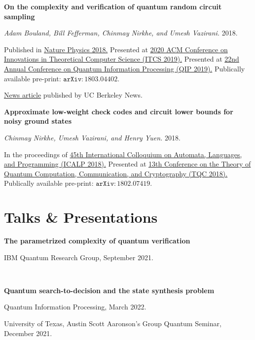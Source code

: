 \documentclass{article}
\begin{document}
\begin{enumerate}[{leftmargin=*,start=8,label=[\arabic*]\addtocounter{enumi}{-2}}]
\item \textbf{On the complexity and verification of quantum random circuit sampling}

\emph{Adam Bouland, Bill Fefferman, Chinmay Nirkhe, and Umesh Vazirani.} 2018.

Published in \href{https://www.nature.com/articles/s41567-018-0318-2}{Nature Physics 2018.}
Presented at \href{http://itcs-conf.org/itcs19/itcs19-cfp.html}{2020 ACM Conference on Innovations in Theoretical Computer Science (ITCS 2019).}
Presented at \href{https://jila.colorado.edu/qip2019/}{22nd Annual Conference on Quantum Information Processing (QIP 2019).}
Publically available pre-print: \href{https://arxiv.org/abs/1803.04402}{$\mathtt{arXiv:1803.04402}$}.

\href{https://news.berkeley.edu/2018/10/29/berkeley-computer-theorists-show-path-to-verifying-that-quantum-beats-classical/}{News article} published by UC Berkeley News.

\item \textbf{Approximate low-weight check codes and circuit lower bounds for noisy ground states}

\emph{Chinmay Nirkhe, Umesh Vazirani, and Henry Yuen.} 2018.

In the proceedings of \href{http://drops.dagstuhl.de/opus/volltexte/2018/9095/}{45th International Colloquium on Automata, Languages, and Programming (ICALP 2018).} 
Presented at \href{https://www.tqc2018.org/}{13th Conference on the Theory of Quantum Computation, Communication, and Cryptography (TQC 2018).}
Publically available pre-print: \href{https://arxiv.org/abs/1802.07419}{$\mathtt{arXiv:1802.07419}$}.

\end{enumerate}


\section{Talks \& Presentations}

\textbf{The parametrized complexity of quantum verification}

IBM Quantum Research Group, September 2021.

\

\textbf{Quantum search-to-decision and the state synthesis problem}

Quantum Information Processing, March 2022.

University of Texas, Austin Scott Aaronson's Group Quantum Seminar, December 2021.
\end{document}
